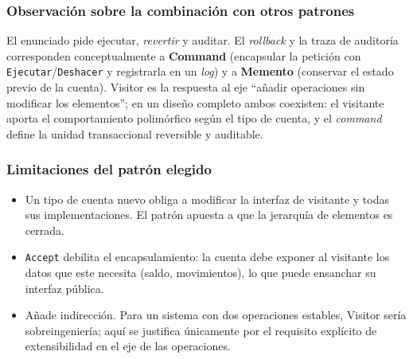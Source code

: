 \subsubsection*{Observación sobre la combinación con otros patrones}

El enunciado pide ejecutar, \emph{revertir} y auditar. El \textit{rollback} y la traza de
auditoría corresponden conceptualmente a \textbf{Command} (encapsular la petición con
\texttt{Ejecutar}/\texttt{Deshacer} y registrarla en un \textit{log}) y a \textbf{Memento}
(conservar el estado previo de la cuenta). Visitor es la respuesta al eje ``añadir operaciones
sin modificar los elementos''; en un diseño completo ambos coexisten: el visitante aporta el
comportamiento polimórfico según el tipo de cuenta, y el \textit{command} define la unidad
transaccional reversible y auditable.

\subsubsection*{Limitaciones del patrón elegido}

\begin{itemize}[leftmargin=1.2cm]
    \item Un tipo de cuenta nuevo obliga a modificar la interfaz de visitante y todas sus
          implementaciones. El patrón apuesta a que la jerarquía de elementos es cerrada.
    \item \texttt{Accept} debilita el encapsulamiento: la cuenta debe exponer al visitante los
          datos que este necesita (saldo, movimientos), lo que puede ensanchar su interfaz
          pública.
    \item Añade indirección. Para un sistema con dos operaciones estables, Visitor sería
          sobreingeniería; aquí se justifica únicamente por el requisito explícito de
          extensibilidad en el eje de las operaciones.
\end{itemize}
